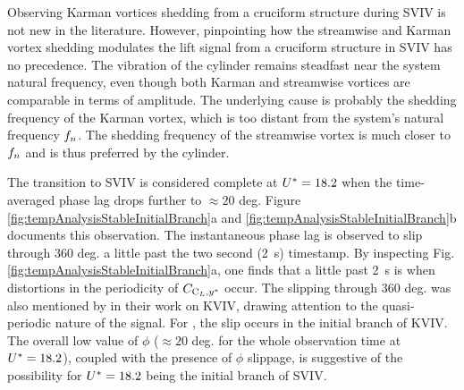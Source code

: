 \documentclass[oneside]{utmthesis}
\begin{document}
Observing Karman vortices shedding from a cruciform structure during SVIV is not new in the literature. However, pinpointing how the streamwise and Karman vortex shedding modulates the lift signal from a cruciform structure in SVIV has no precedence. The vibration of the cylinder remains steadfast near the system natural frequency, even though both Karman and streamwise vortices are comparable in terms of amplitude. The underlying cause is probably the shedding frequency of the Karman vortex, which is too distant from the system's natural frequency $f_{n}$. The shedding frequency of the streamwise vortex is much closer to $f_{n}$ and is thus preferred by the cylinder.

The transition to SVIV is considered complete at $U^{*} = 18.2$ when the time-averaged phase lag drops further to $\approx 20$ deg. Figure \ref{fig:tempAnalysisStableInitialBranch}a and \ref{fig:tempAnalysisStableInitialBranch}b documents this observation. The instantaneous phase lag is observed to slip through 360 deg. a little past the two second (\SI{2}{\second}) timestamp. By inspecting Fig. \ref{fig:tempAnalysisStableInitialBranch}a, one finds that a little past \SI{2}{\second} is when distortions in the periodicity of $C_{\text{C}_{L},y^{*}}$ occur. The slipping through 360 deg. was also mentioned by \citet{Khalak1999} in their work on KVIV, drawing attention to the quasi-periodic nature of the signal. For \citet{Khalak1999}, the slip occurs in the initial branch of KVIV. The overall low value of $\phi$ ($\approx 20$ deg. for the whole observation time at $U^{*} = 18.2$), coupled with the presence of $\phi$ slippage, is suggestive of the possibility for $U^{*} = 18.2$ being the initial branch of SVIV.
\end{document}
